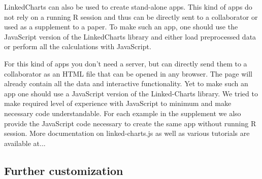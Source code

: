 \documentclass[twocolumn,10pt]{article}
\begin{document}
LinkedCharts can also be used to create stand-alone apps. This kind of apps do not rely on a running R session and thus can be directly sent to a collaborator or used as a supplement to a paper. To make such an app, one should use the JavaScript version of the LinkedCharts library and either load preprocessed data or perform all the calculations with JavaScript. 

For this kind of apps you don't need a server, but can directly send them to a collaborator as an HTML file that can be opened in any browser. The page will already contain all the data and interactive functionality. Yet to make such an app one should use a JavaScript version of the Linked-Charts library. We tried to make required level of experience with JavaScript to minimum and make necessary code understandable. For each example in the supplement we also provide the JavaScript code necessary to create the same app without running R session. More documentation on linked-charts.js as well as various tutorials are available at...

\subsection{Further customization}

\begin{small} 
\balance

\end{small}
\end{document}
